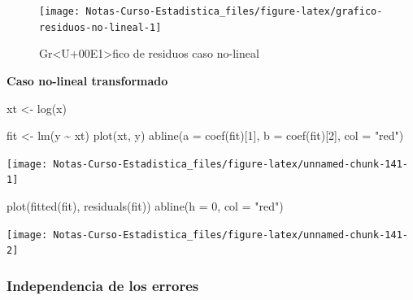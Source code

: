 \documentclass[
  12pt,
]{book}
\newenvironment{Shaded}{\begin{snugshade}}{\end{snugshade}}
\newcommand{\AttributeTok}[1]{\textcolor[rgb]{0.77,0.63,0.00}{#1}}
\newcommand{\DecValTok}[1]{\textcolor[rgb]{0.00,0.00,0.81}{#1}}
\newcommand{\FunctionTok}[1]{\textcolor[rgb]{0.00,0.00,0.00}{#1}}
\newcommand{\NormalTok}[1]{#1}
\newcommand{\OtherTok}[1]{\textcolor[rgb]{0.56,0.35,0.01}{#1}}
\newcommand{\SpecialCharTok}[1]{\textcolor[rgb]{0.00,0.00,0.00}{#1}}
\newcommand{\StringTok}[1]{\textcolor[rgb]{0.31,0.60,0.02}{#1}}
\theoremstyle{definition}
\theoremstyle{definition}
\theoremstyle{definition}
\theoremstyle{definition}
\theoremstyle{remark}
\begin{document}
\begin{figure}

{\centering \texttt{[image: Notas-Curso-Estadistica\_files/figure-latex/grafico-residuos-no-lineal-1]} 

}

\caption{Gr<U+00E1>fico de residuos caso no-lineal}\label{fig:grafico-residuos-no-lineal}
\end{figure}

\textbf{Caso no-lineal transformado}

\begin{Shaded}
\begin{Highlighting}[]
\NormalTok{xt }\OtherTok{\textless{}{-}} \FunctionTok{log}\NormalTok{(x)}


\NormalTok{fit }\OtherTok{\textless{}{-}} \FunctionTok{lm}\NormalTok{(y }\SpecialCharTok{\textasciitilde{}}\NormalTok{ xt)}
\FunctionTok{plot}\NormalTok{(xt, y)}
\FunctionTok{abline}\NormalTok{(}\AttributeTok{a =} \FunctionTok{coef}\NormalTok{(fit)[}\DecValTok{1}\NormalTok{], }\AttributeTok{b =} \FunctionTok{coef}\NormalTok{(fit)[}\DecValTok{2}\NormalTok{], }\AttributeTok{col =} \StringTok{"red"}\NormalTok{)}
\end{Highlighting}
\end{Shaded}

\begin{center}\texttt{[image: Notas-Curso-Estadistica\_files/figure-latex/unnamed-chunk-141-1]} \end{center}

\begin{Shaded}
\begin{Highlighting}[]
\FunctionTok{plot}\NormalTok{(}\FunctionTok{fitted}\NormalTok{(fit), }\FunctionTok{residuals}\NormalTok{(fit))}
\FunctionTok{abline}\NormalTok{(}\AttributeTok{h =} \DecValTok{0}\NormalTok{, }\AttributeTok{col =} \StringTok{"red"}\NormalTok{)}
\end{Highlighting}
\end{Shaded}

\begin{center}\texttt{[image: Notas-Curso-Estadistica\_files/figure-latex/unnamed-chunk-141-2]} \end{center}

\hypertarget{independencia-de-los-errores}{%
\subsubsection{Independencia de los errores}\label{independencia-de-los-errores}}
\end{document}
